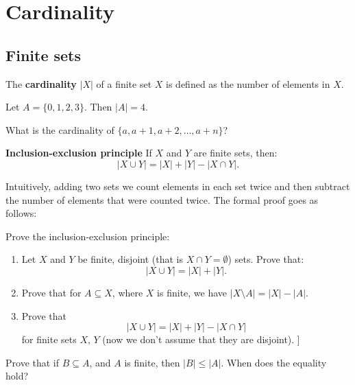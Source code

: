 \section{Cardinality}
\subsection{Finite sets}
\begin{definition}
  The \textbf{cardinality} $|X|$ of a finite set $X$ is defined as the number of elements in $X$.
\end{definition}

\begin{example}
  Let $A=\{0,1,2,3\}$. Then $|A|=4$.
\end{example}

\begin{exercise}
	What is the cardinality of $\{a, a+1, a+2, \dots, a+n\}$?
\end{exercise}

\begin{theorem}
  \textbf{Inclusion-exclusion principle}
  If $X$ and $Y$ are finite sets, then:
  $$|X\cup Y|=|X|+|Y|-|X\cap Y|.$$
\end{theorem}

Intuitively, adding two sets we count elements in each set twice and then subtract the number of elements that were counted twice. The formal proof goes as follows:

\begin{exercise}
  Prove the inclusion-exclusion principle:

  \begin{enumerate}
    \item Let $X$ and $Y$ be finite, disjoint (that is $X\cap Y=\emptyset$) sets. Prove that:
    $$|X\cup Y| = |X| + |Y|.$$
    \item Prove that for $A\subseteq X$, where $X$ is finite, we have $|X\setminus A|=|X|-|A|$. 
    \item Prove that $$|X\cup Y|=|X|+|Y|-|X\cap Y|$$ for finite sets $X,\, Y$ (now we don't assume that they are disjoint). ]
  \end{enumerate}
\end{exercise}

\begin{exercise}
  Prove that if $B\subseteq A$, and $A$ is finite, then $|B|\le |A|$. When does the equality hold?
\end{exercise}

